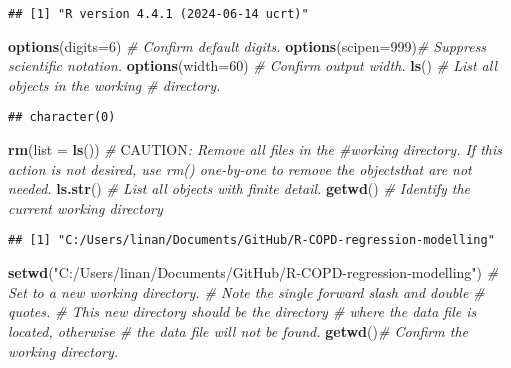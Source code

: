 \documentclass[
]{article}
\newenvironment{Shaded}{\begin{snugshade}}{\end{snugshade}}
\newcommand{\AlertTok}[1]{\textcolor[rgb]{0.94,0.16,0.16}{#1}}
\newcommand{\AttributeTok}[1]{\textcolor[rgb]{0.13,0.29,0.53}{#1}}
\newcommand{\CommentTok}[1]{\textcolor[rgb]{0.56,0.35,0.01}{\textit{#1}}}
\newcommand{\DecValTok}[1]{\textcolor[rgb]{0.00,0.00,0.81}{#1}}
\newcommand{\FunctionTok}[1]{\textcolor[rgb]{0.13,0.29,0.53}{\textbf{#1}}}
\newcommand{\NormalTok}[1]{#1}
\newcommand{\StringTok}[1]{\textcolor[rgb]{0.31,0.60,0.02}{#1}}
\begin{document}
\begin{verbatim}
## [1] "R version 4.4.1 (2024-06-14 ucrt)"
\end{verbatim}

\begin{Shaded}
\begin{Highlighting}[]
\FunctionTok{options}\NormalTok{(}\AttributeTok{digits=}\DecValTok{6}\NormalTok{) }\CommentTok{\# Confirm default digits.}
\FunctionTok{options}\NormalTok{(}\AttributeTok{scipen=}\DecValTok{999}\NormalTok{)}\CommentTok{\# Suppress scientific notation.}
\FunctionTok{options}\NormalTok{(}\AttributeTok{width=}\DecValTok{60}\NormalTok{) }\CommentTok{\# Confirm output width. }
\FunctionTok{ls}\NormalTok{() }\CommentTok{\# List all objects in the working \# directory.}
\end{Highlighting}
\end{Shaded}

\begin{verbatim}
## character(0)
\end{verbatim}

\begin{Shaded}
\begin{Highlighting}[]
\FunctionTok{rm}\NormalTok{(}\AttributeTok{list =} \FunctionTok{ls}\NormalTok{()) }\CommentTok{\# }\AlertTok{CAUTION}\CommentTok{: Remove all files in the \#working directory. If this action is not desired, use rm() one{-}by{-}one to remove the objectsthat are not needed.}
\FunctionTok{ls.str}\NormalTok{() }\CommentTok{\# List all objects with finite detail.}
\FunctionTok{getwd}\NormalTok{() }\CommentTok{\# Identify the current working directory}
\end{Highlighting}
\end{Shaded}

\begin{verbatim}
## [1] "C:/Users/linan/Documents/GitHub/R-COPD-regression-modelling"
\end{verbatim}

\begin{Shaded}
\begin{Highlighting}[]
\FunctionTok{setwd}\NormalTok{(}\StringTok{"C:/Users/linan/Documents/GitHub/R{-}COPD{-}regression{-}modelling"}\NormalTok{) }\CommentTok{\# Set to a new working directory. \# Note the single forward slash and double \# quotes. \# This new directory should be the directory \# where the data file is located, otherwise \# the data file will not be found.}
\FunctionTok{getwd}\NormalTok{()}\CommentTok{\# Confirm the working directory.}
\end{Highlighting}
\end{Shaded}
\end{document}
